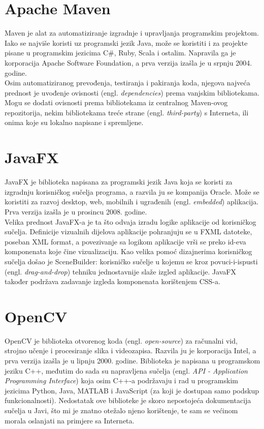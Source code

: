 \documentclass[times, utf8, zavrsni, numeric]{fer}
\begin{document}
\section{Apache Maven}
Maven je alat za automatiziranje izgradnje i upravljanja programskim projektom. Iako se najviše koristi uz programski jezik Java, može se koristiti i za projekte pisane u programskim jezicima C\#, Ruby, Scala i ostalim. Napravila ga je korporacija Apache Software Foundation, a prva verzija izašla je u srpnju 2004. godine\cite{maven}.\\

Osim automatiziranog prevođenja, testiranja i pakiranja koda, njegova najveća prednost je uvođenje ovisnosti (engl. \textit{dependencies}) prema vanjskim bibliotekama. Mogu se dodati ovisnosti prema bibliotekama iz centralnog Maven-ovog repozitorija, nekim bibliotekama treće strane (engl. \textit{third-party}) s Interneta, ili onima koje su lokalno napisane i spremljene.

\section{JavaFX}
JavaFX je biblioteka napisana za programski jezik Java koja se koristi za izgradnju korisničkog sučelja programa, a razvila ju se kompanija Oracle. Može se koristiti za razvoj desktop, web, mobilnih i ugrađenih (engl. \textit{embedded}) aplikacija. Prva verzija izašla je u prosincu 2008. godine\cite{javafx}.\\

Velika prednost JavaFX-a je ta što odvaja izradu logike aplikacije od korisničkog sučelja. Definicije vizualnih dijelova aplikacije pohranjuju se u FXML datoteke, poseban XML format, a povezivanje sa logikom aplikacije vrši se preko id-eva komponenata koje čine vizualizaciju. Kao velika pomoć dizajnerima korisničkog sučelja došao je SceneBuilder: korisničko sučelje u kojemu se kroz povuci-i-ispusti (engl. \textit{drag-and-drop}) tehniku jednostavnije slaže izgled aplikacije. JavaFX također podržava zadavanje izgleda komponenata korištenjem CSS-a.

\section{OpenCV}
OpenCV je biblioteka otvorenog koda (engl. \textit{open-source}) za računalni vid, strojno učenje i procesiranje slika i videozapisa. Razvila ju je korporacija Intel, a prva verzija izašla je u lipnju 2000. godine. Biblioteka je napisana u programskom jeziku C++, međutim do sada su napravljena sučelja (engl. \textit{API - Application Programming Interface}) koja osim C++-a podržavaju i rad u programskim jezicima Python, Java, MATLAB i JavaScript (za koji je dostupan samo podskup funkcionalnosti)\cite{opencv}. Nedostatak ove biblioteke je skoro nepostojeća dokumentacija sučelja u Javi, što mi je znatno otežalo njeno korištenje, te sam se većinom morala oslanjati na primjere sa Interneta.\\
\end{document}
